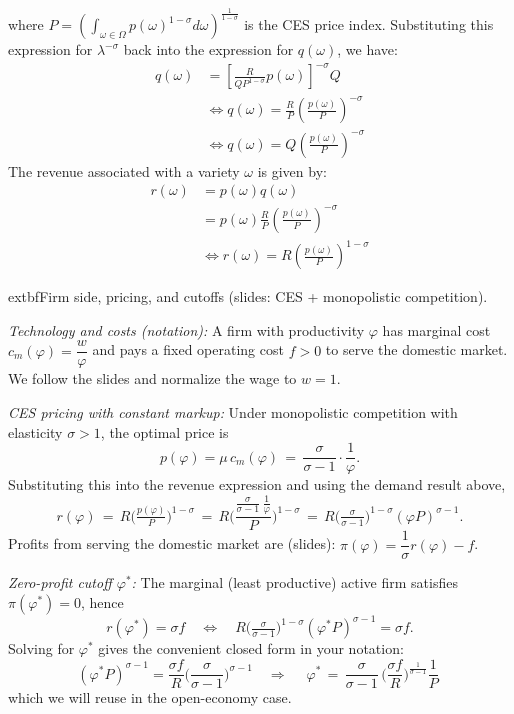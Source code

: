 \begin{solution}
    where $P = \left( \int_{\omega \in \Omega} p(\omega)^{1 - \sigma} d\omega \right)^{\frac{1}{1 - \sigma}}$ is the CES price index. Substituting this expression for $\lambda^{-\sigma}$ back into the expression for $q(\omega)$, we have:
    \begin{align*}
        q(\omega) &= \left[ \frac{R}{Q P^{1 - \sigma}} p(\omega) \right]^{-\sigma} Q \\
        &\iff q(\omega) = \frac{R}{P} \left( \frac{p(\omega)}{P} \right)^{-\sigma}\\
        &\iff q(\omega) = Q \left( \frac{p(\omega)}{P} \right)^{-\sigma}
    \end{align*}
    The revenue associated with a variety $\omega$ is given by:
    \begin{align*}
        r(\omega) &= p(\omega) q(\omega) \\
        &= p(\omega) \frac{R}{P} \left( \frac{p(\omega)}{P} \right)^{-\sigma} \\
        &\iff r(\omega) = R \left( \frac{p(\omega)}{P} \right)^{1 - \sigma}
    \end{align*}
    
    \bigskip
    	extbf{Firm side, pricing, and cutoffs (slides: CES + monopolistic competition).}
    
    \emph{Technology and costs (notation):} A firm with productivity $\varphi$ has marginal cost $c_m(\varphi)=\dfrac{w}{\varphi}$ and pays a fixed operating cost $f>0$ to serve the domestic market. We follow the slides and normalize the wage to $w=1$.
    
    \emph{CES pricing with constant markup:} Under monopolistic competition with elasticity $\sigma>1$, the optimal price is
    \[
        p(\varphi) = \mu\, c_m(\varphi) \,=\, \frac{\sigma}{\sigma-1}\cdot\frac{1}{\varphi} .
    \]
    Substituting this into the revenue expression and using the demand result above,
    \[
        r(\varphi) \,=\, R\Big(\tfrac{p(\varphi)}{P}\Big)^{1-\sigma}
        \,=\, R\Big( \frac{\tfrac{\sigma}{\sigma-1}\,\tfrac{1}{\varphi}}{P} \Big)^{1-\sigma}
        \,=\, R\Big(\tfrac{\sigma}{\sigma-1}\Big)^{1-\sigma} (\varphi P)^{\sigma-1} .
    \]
    Profits from serving the domestic market are (slides): $\pi(\varphi) = \dfrac{1}{\sigma} r(\varphi) - f$.
    
    \emph{Zero-profit cutoff $\varphi^*$:} The marginal (least productive) active firm satisfies $\pi(\varphi^*)=0$, hence
    \[
        r(\varphi^*) = \sigma f
        \quad\Longleftrightarrow\quad
        R\Big(\tfrac{\sigma}{\sigma-1}\Big)^{1-\sigma} (\varphi^* P)^{\sigma-1} = \sigma f.
    \]
    Solving for $\varphi^*$ gives the convenient closed form in your notation:
    \[
        (\varphi^* P)^{\sigma-1} = \frac{\sigma f}{R}\Big(\frac{\sigma}{\sigma-1}\Big)^{\sigma-1}
        \quad\Rightarrow\quad
        \boxed{\;\displaystyle \varphi^* \,=\, \frac{\sigma}{\sigma-1}\,\Big(\frac{\sigma f}{R}\Big)^{\!\frac{1}{\sigma-1}} \frac{1}{P}\; } 
    \]
    which we will reuse in the open-economy case.
    

\end{solution}
